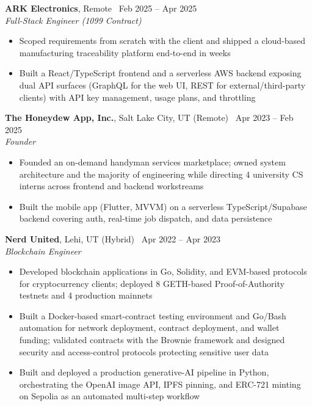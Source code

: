 \documentclass[10.5pt, letterpaper]{article}
\newcommand{\jobentry}[4]{%
  \noindent
  \textbf{\color{accent}#1}\textcolor{muted}{, #2 \textbullet\ #4}\\
  \textit{#3}%
}
\begin{document}
\vspace{2pt}

\jobentry{ARK Electronics}{Remote}{Full-Stack Engineer \normalfont\small(1099 Contract)}{Feb 2025 -- Apr 2025}
\begin{itemize}
  \item Scoped requirements from scratch with the client and shipped a
        cloud-based manufacturing traceability platform end-to-end in weeks
  \item Built a React/TypeScript frontend and a serverless AWS backend
        exposing dual API surfaces (GraphQL for the web UI, REST for
        external/third-party clients) with API key management, usage
        plans, and throttling
\end{itemize}

\vspace{2pt}

\jobentry{The Honeydew App, Inc.}{Salt Lake City, UT (Remote)}{Founder}{Apr 2023 -- Feb 2025}
\begin{itemize}
  \item Founded an on-demand handyman services marketplace; owned system
        architecture and the majority of engineering while directing 4
        university CS interns across frontend and backend workstreams
  \item Built the mobile app (Flutter, MVVM) on a serverless TypeScript/Supabase
        backend covering auth, real-time job dispatch, and data persistence
\end{itemize}

\vspace{2pt}

\jobentry{Nerd United}{Lehi, UT (Hybrid)}{Blockchain Engineer}{Apr 2022 -- Apr 2023}
\begin{itemize}
  \item Developed blockchain applications in Go, Solidity, and EVM-based
        protocols for cryptocurrency clients; deployed 8 GETH-based
        Proof-of-Authority testnets and 4 production mainnets
  \item Built a Docker-based smart-contract testing environment and Go/Bash
        automation for network deployment, contract deployment, and wallet
        funding; validated contracts with the Brownie framework and designed
        security and access-control protocols protecting sensitive user data
  \item Built and deployed a production generative-AI pipeline in Python,
        orchestrating the OpenAI image API, IPFS pinning, and ERC-721 minting
        on Sepolia as an automated multi-step workflow
\end{itemize}
\end{document}
